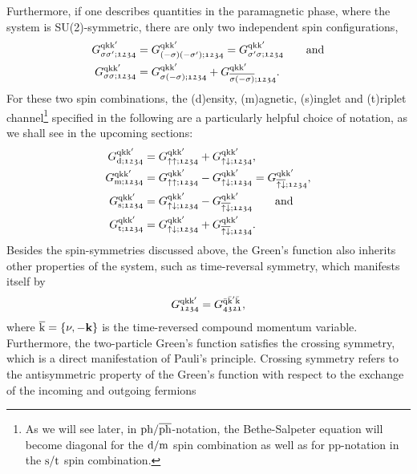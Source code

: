 \documentclass[\main/main.tex]{subfiles}
\begin{document}
Furthermore, if one describes quantities in the paramagnetic phase, where the system is SU(2)-symmetric, there are only two independent spin configurations,
\begin{subequations}
\begin{align}
	G_{\sigma\sigma';\mathfrak{1234}}^{\text{q}\text{k}\text{k}'}&=G_{(-\sigma)(-\sigma');\mathfrak{1234}}^{\text{q}\text{k}\text{k}'}=G_{\sigma'\sigma;\mathfrak{1234}}^{\text{q}\text{k}\text{k}'}\qquad\text{and}\\
	G_{\sigma\sigma;\mathfrak{1234}}^{\text{q}\text{k}\text{k}'}&=G_{\sigma(-\sigma);\mathfrak{1234}}^{\text{q}\text{k}\text{k}'}+G_{\overline{\sigma(-\sigma)};\mathfrak{1234}}^{\text{q}\text{k}\text{k}'}.
\end{align}
\end{subequations}
For these two spin combinations, the (d)ensity, (m)agnetic, (s)inglet and (t)riplet channel\footnote{As we will see later, in $\text{ph}/\overline{\text{ph}}$-notation, the Bethe-Salpeter equation will become diagonal for the $\text{d}/\text{m}$ spin combination as well as for pp-notation in the $\text{s}/\text{t}$ spin combination.} specified in the following are a particularly helpful choice of notation, as we shall see in the upcoming sections: 
\begin{subequations}
\begin{align}
	G_{\text{d};\mathfrak{1234}}^{\text{q}\text{k}\text{k}'}&=G_{\uparrow\uparrow;\mathfrak{1234}}^{\text{q}\text{k}\text{k}'}+G_{\uparrow\downarrow;\mathfrak{1234}}^{\text{q}\text{k}\text{k}'},\label{eq:two_particle_green_density}\\
	G_{\text{m};\mathfrak{1234}}^{\text{q}\text{k}\text{k}'}&=G_{\uparrow\uparrow;\mathfrak{1234}}^{\text{q}\text{k}\text{k}'}-G_{\uparrow\downarrow;\mathfrak{1234}}^{\text{q}\text{k}\text{k}'}=G_{\overline{\uparrow\downarrow};\mathfrak{1234}}^{\text{q}\text{k}\text{k}'},\label{eq:two_particle_green_magnetic}\\
	G_{\text{s};\mathfrak{1234}}^{\text{q}\text{k}\text{k}'}&=G^{\text{q}\text{k}\text{k}'}_{\uparrow\downarrow;\mathfrak{1234}}-G^{\text{q}\text{k}\text{k}'}_{\overline{\uparrow\downarrow};\mathfrak{1234}}\qquad\text{and}\\
	G_{\text{t};\mathfrak{1234}}^{\text{q}\text{k}\text{k}'}&=G^{\text{q}\text{k}\text{k}'}_{\uparrow\downarrow;\mathfrak{1234}}+G^{\text{q}\text{k}\text{k}'}_{\overline{\uparrow\downarrow};\mathfrak{1234}}.
\end{align}
\end{subequations}
Besides the spin-symmetries discussed above, the Green's function also inherits other properties of the system, such as time-reversal symmetry, which manifests itself by
\begin{align}
	G_{\mathfrak{1234}}^{\text{q}\text{k}\text{k}'}=G_{\mathfrak{4321}}^{\bar{\text{q}}\bar{\text{k}}'\bar{\text{k}}},
\end{align} 
where $\overline{\text{k}}=\{\nu,-\textbf{k}\}$ is the time-reversed compound momentum variable. Furthermore, the two-particle Green's function satisfies the crossing symmetry, which is a direct manifestation of Pauli's principle. Crossing symmetry refers to the antisymmetric property of the Green's function with respect to the exchange of the incoming and outgoing fermions
\end{document}

